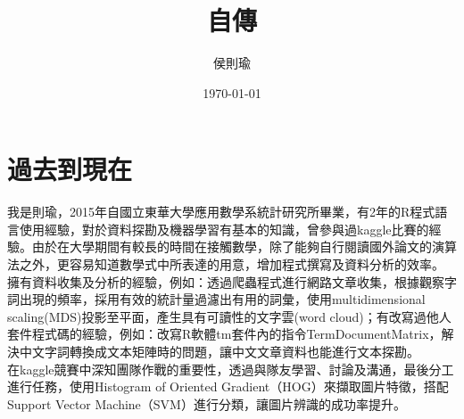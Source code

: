 \documentclass[paper=a4, fontsize=12pt]{scrartcl} %
\title{	
\normalfont \normalsize 
\huge 自傳 \\ %
}
\author{侯則瑜} %
\date{\normalsize\today} %
\numberwithin{equation}{section} %
\numberwithin{figure}{section} %
\numberwithin{table}{section} %
\begin{document}
\maketitle %


\section*{過去到現在}
\quad\quad
我是則瑜，2015年自國立東華大學應用數學系統計研究所畢業，有2年的R程式語言使用經驗，對於資料探勘及機器學習有基本的知識，曾參與過kaggle比賽的經驗。由於在大學期間有較長的時間在接觸數學，除了能夠自行閱讀國外論文的演算法之外，更容易知道數學式中所表達的用意，增加程式撰寫及資料分析的效率。\\

\quad\quad
擁有資料收集及分析的經驗，例如：透過爬蟲程式進行網路文章收集，根據觀察字詞出現的頻率，採用有效的統計量過濾出有用的詞彙，使用multidimensional scaling(MDS)投影至平面，產生具有可讀性的文字雲(word cloud)；有改寫過他人套件程式碼的經驗，例如：改寫R軟體tm套件內的指令TermDocumentMatrix，解決中文字詞轉換成文本矩陣時的問題，讓中文文章資料也能進行文本探勘。\\

\quad\quad
在kaggle競賽中深知團隊作戰的重要性，透過與隊友學習、討論及溝通，最後分工進行任務，使用Histogram of Oriented Gradient（HOG）來擷取圖片特徵，搭配Support Vector Machine（SVM）進行分類，讓圖片辨識的成功率提升。
\end{document}
